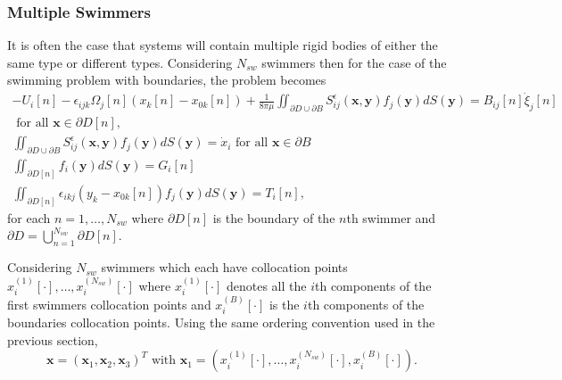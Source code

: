 \subsubsection{Multiple Swimmers} \label{sec:multipleSwimmers}
It is often the case that systems will contain multiple rigid bodies of either the same type or different types. Considering $N_{sw}$ swimmers then for the case of the swimming problem with boundaries, the problem becomes
\begin{equation}
\label{eq:swimmingProblemMulti}
\begin{gathered}
    -U_{i}[n]-\epsilon_{i j k} \Omega_{j}[n]\left(x_{k}[n]-x_{0 k}[n]\right)+\frac{1}{8 \pi\mu} \iint_{\partial D \cup \partial B} S_{i j}^{\epsilon}(\bm{x}, \bm{y}) f_{j}(\bm{y}) d S({\bm{y}})=B_{i j}[n] \dot{\xi}_{j}[n] \\ \text { for all } \bm{x} \in \partial D[n], \\
    \iint_{\partial D \cup \partial B} S_{i j}^{\epsilon}(\bm{x}, \bm{y}) f_{j}(\bm{y}) d S({\bm{y}}) = \dot{x}_i \text { for all } \bm{x} \in \partial B \\
    \iint_{\partial D[n]} f_{i}(\bm{y}) d S({\bm{y}})=G_i[n] \\
    \iint_{\partial D[n]} \epsilon_{i k j} (y_{k}-x_{0 k}[n]) f_{j}(\bm{y}) d S({\bm{y}})=T_i[n],
\end{gathered}
\end{equation}
for each $n=1,\dots,N_{sw}$ where $\partial D[n]$ is the boundary of the $n$th swimmer and $\partial D = \bigcup_{n=1}^{N_{sw}} \partial D[n]$.

Considering $N_{sw}$ swimmers which each have collocation points $x_i^{(1)}[\cdot],\dots,x_i^{(N_{sw})}[\cdot]$ where $x_i^{(1)}[\cdot]$ denotes all the $i$th components of the first swimmers collocation points and $x_i^{(B)}[\cdot]$ is the $i$th components of the boundaries collocation points. Using the same ordering convention used in the previous section,
\begin{equation*}
    \bm{x} = (\bm{x}_1,\bm{x}_2,\bm{x}_3)^T \text{ with } \bm{x}_1=(x_i^{(1)}[\cdot],\dots,x_i^{(N_{sw})}[\cdot],x_i^{(B)}[\cdot]).
\end{equation*}

